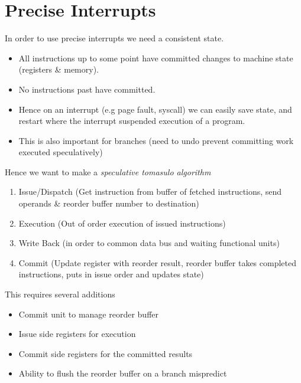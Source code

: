 \section{Precise Interrupts}
In order to use precise interrupts we need a consistent state.
\begin{itemize}
    \item All instructions up to some point have committed changes to machine state (registers \& memory).
    \item No instructions past have committed.
    \item Hence on an interrupt (e.g page fault, syscall) we can easily save state, and restart where the interrupt suspended execution of a program.
    \item This is also important for branches (need to undo prevent committing work executed speculatively)
\end{itemize}
Hence we want to make a \textit{speculative tomasulo algorithm}
\begin{enumerate}
    \item Issue/Dispatch (Get instruction from buffer of fetched instructions, send operands \& reorder buffer number to destination)
    \item Execution (Out of order execution of issued instructions)
    \item Write Back (in order to common data bus and waiting functional units)
    \item Commit (Update register with reorder result, reorder buffer takes completed instructions, puts in issue order and updates state)
\end{enumerate}
This requires several additions
\begin{itemize}
    \item Commit unit to manage reorder buffer
    \item Issue side registers for execution
    \item Commit side registers for the committed results
    \item Ability to flush the reorder buffer on a branch mispredict
\end{itemize}

